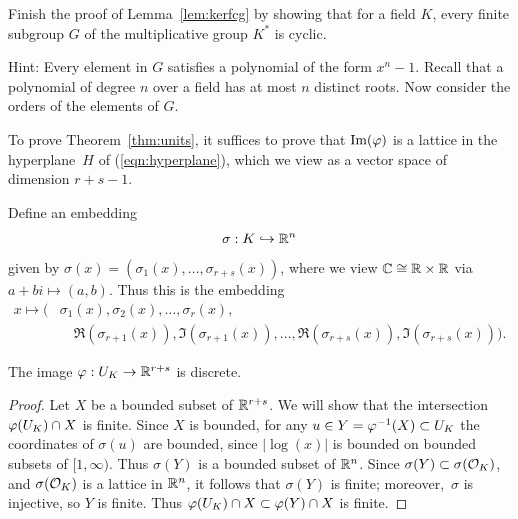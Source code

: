 \begin{exercise}\label{ex:finitesubgroupoffieldcyclic}
	Finish the proof of Lemma~\ref{lem:kerfcg}
	by showing that for a field $K$, every finite
	subgroup $G$ of the multiplicative group $K^*$
	is cyclic.
	
	Hint: Every element in $G$ satisfies a polynomial
	of the form $x^n-1$. Recall that a polynomial
	of degree $n$ over a field has at most $n$
	distinct roots. Now consider the orders
	of the elements of $G$.
\end{exercise}

To prove Theorem~\ref{thm:units}, it suffices to prove that
$\text{Im}(\varphi)$ is a lattice in the hyperplane~$H$ of
(\ref{eqn:hyperplane}), which we view as a vector space of dimension
$r+s-1$.

Define an embedding
\begin{equation}\label{eqn:sigma3}
 \sigma : K\hookrightarrow \mathbb{R}^n
\end{equation}
given by $\sigma(x) = (\sigma_1(x),\ldots,\sigma_{r+s}(x))$,
where we view $\mathbb{C}\cong \mathbb{R}\times \mathbb{R}$ via $a+b i\mapsto (a,b)$.
Thus this is the embedding
\begin{align*}
 x\mapsto \big(&\sigma_1(x), \sigma_2(x),\ldots, \sigma_r(x),\\
     &\quad \Re(\sigma_{r+1}(x)), \Im(\sigma_{r+1}(x)),
    \ldots, \Re(\sigma_{r+s}(x)), \Im(\sigma_{r+s}(x))\big).
\end{align*}

\begin{lemma}\label{lem:ukdiscrete}
The image $\varphi:U_K\to \mathbb{R}^{r+s}$ is discrete.
\end{lemma}
\begin{proof}
Let $X$ be a bounded subset of $\mathbb{R}^{r+s}$.
We will show that the intersection $\varphi(U_K)\cap X$ is finite.
Since $X$ is bounded, for any $u\in
Y=\varphi^{-1}(X)\subset U_K$ the coordinates of $\sigma(u)$ are bounded,
since $|\log(x)|$ is bounded on bounded subsets
of $[1,\infty)$.
Thus $\sigma(Y)$ is
a bounded subset of $\mathbb{R}^n$.  Since $\sigma(Y)\subset \sigma(\mathcal{O}_K)$,
and $\sigma(\mathcal{O}_K)$ is a lattice in $\mathbb{R}^n$, it follows that $\sigma(Y)$
is finite; moreover,~$\sigma$ is injective, so $Y$ is finite.
Thus $\varphi(U_K)\cap X \subset \varphi(Y) \cap X$ is finite.
\end{proof}

